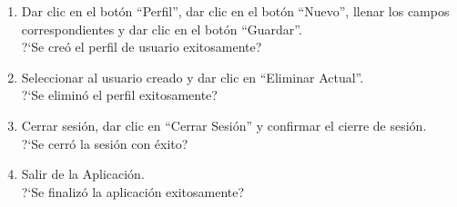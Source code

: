\begin{enumerate}
{			?`Se realizó la actividad exitosamente?
	}
	\item {Dar clic en el botón ``Perfil'', dar clic en el botón ``Nuevo'', llenar los campos correspondientes y dar clic en el botón ``Guardar''.\\
			?`Se creó el perfil de usuario exitosamente?
	}
	\item {Seleccionar al usuario creado y dar clic en ``Eliminar Actual''.\\
			?`Se eliminó el perfil exitosamente?
	}
	\item {Cerrar sesión, dar clic en ``Cerrar Sesión'' y confirmar el cierre de sesión.\\	
	?`Se cerró la sesión con éxito?
	}
	\item {Salir de la Aplicación.\\	
	?`Se finalizó la aplicación exitosamente?
	}
\end{enumerate}

